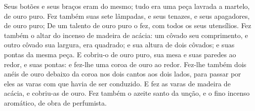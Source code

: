 {  Seus botões e seus braços eram do mesmo; tudo era uma peça lavrada a martelo, de ouro puro.
  Fez também suas sete lâmpadas, e seus tenazes, e seus apagadores, de ouro puro;
  De um talento de ouro puro o fez, com todos os seus utensílios.
  Fez também o altar do incenso de madeira de acácia: um côvado seu comprimento, e outro côvado sua largura, era quadrado; e sua altura de dois côvados; e suas pontas da mesma peça.
  E cobriu-o de ouro puro, sua mesa e suas paredes ao redor, e suas pontas: e fez-lhe uma coroa de ouro ao redor.
  Fez-lhe também dois anéis de ouro debaixo da coroa nos dois cantos aos dois lados, para passar por eles as varas com que havia de ser conduzido.
  E fez as varas de madeira de acácia, e cobriu-as de ouro.
  Fez também o azeite santo da unção, e o fino incenso aromático, de obra de perfumista.
\par }

